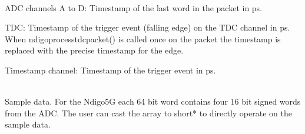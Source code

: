 	\\
	ADC channels A to D: Timestamp of the last word in the packet in ps.\par
	
	TDC: Timestamp of the trigger event (falling edge) on the TDC channel in ps. When \textsf{ndigo\tu process\tu tdc\tu packet()} is called once on the packet the timestamp is replaced with the precise timestamp for the edge.\par

	Timestamp channel: Timestamp of the trigger event in ps.\par

	\\
	Sample data. For the Ndigo5G each 64 bit word contains four 16 bit signed words from the ADC. The user can cast the array to short* to directly operate on the sample data.
